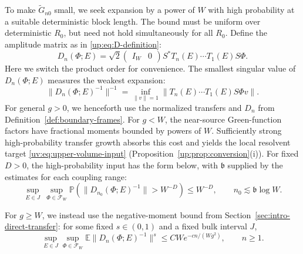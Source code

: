 \documentclass[11pt]{article}
\numberwithin{equation}{section}
\theoremstyle{remark}
\newcommand{\E}{\mathbb E}
\newcommand{\Prob}{\mathbb P}
\begin{document}
To make $\widetilde G_{n0}$ small, we seek expansion by a power of $W$
with high probability at a suitable deterministic block length.
The bound must be uniform over deterministic $R_0$, but need not hold
simultaneously for all $R_0$.
Define the amplitude matrix as in \eqref{up:eq:D-definition}:
\[
 D_n(\Phi;E)=\sqrt2\begin{pmatrix}I_W&0\end{pmatrix}
                  S^*T_n(E)\cdots T_1(E)S\Phi.
\]
Here we switch the product order for convenience. The smallest singular
value of $D_n(\Phi;E)$ measures the weakest expansion:
\[
 \|D_n(\Phi;E)^{-1}\|^{-1}
 =\inf_{\|v\|=1}\|T_n(E)\cdots T_1(E)S\Phi v\|.
\]
For general $g>0$, we henceforth use the normalized transfers and
$D_n$ from Definition~\ref{def:boundary-frames}.
For $g<W$, the near-source Green-function factors
have fractional moments bounded by powers of $W$. Sufficiently strong
high-probability transfer growth absorbs this cost and yields the local
resolvent target \eqref{uv:eq:upper-volume-input}
(Proposition~\ref{up:prop:conversion}\textup{(i)}).
For fixed $D>0$, the high-probability input has the form below, with
$\mathfrak b$ supplied by the estimates for each coupling range:
\begin{equation}\label{DnWDWD}
 \sup_{E\in J}\ \sup_{\Phi\in\mathcal F_W}
 \Prob\!\left(\|D_{n_0}(\Phi;E)^{-1}\|>W^{-D}\right)
 \le W^{-D},\qquad
 n_0\lesssim\mathfrak b\log W.
\end{equation}

For $g\ge W$, we instead use the negative-moment bound from
Section~\ref{sec:intro-direct-transfer}: for some fixed $s\in(0,1)$
and a fixed bulk interval $J$,
\begin{equation}\label{intro:eq:negative-transfer}
 \sup_{E\in J}\sup_{\Phi\in\mathcal F_W}
 \E\|D_n(\Phi;E)^{-1}\|^s
 \le CW e^{-cn/(Wg^2)},\qquad n\ge1.
\end{equation}
\end{document}
